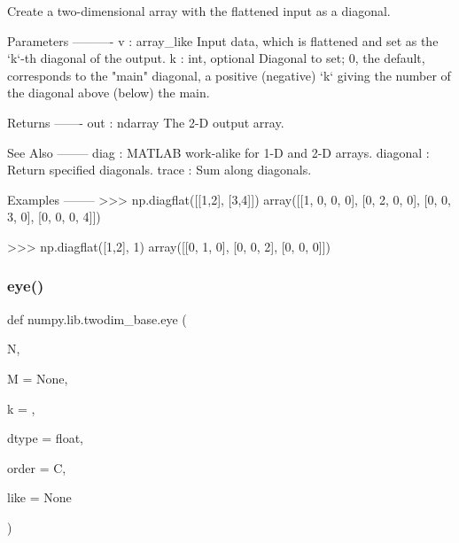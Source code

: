 \begin{DoxyVerb}Create a two-dimensional array with the flattened input as a diagonal.

Parameters
----------
v : array_like
    Input data, which is flattened and set as the `k`-th
    diagonal of the output.
k : int, optional
    Diagonal to set; 0, the default, corresponds to the "main" diagonal,
    a positive (negative) `k` giving the number of the diagonal above
    (below) the main.

Returns
-------
out : ndarray
    The 2-D output array.

See Also
--------
diag : MATLAB work-alike for 1-D and 2-D arrays.
diagonal : Return specified diagonals.
trace : Sum along diagonals.

Examples
--------
>>> np.diagflat([[1,2], [3,4]])
array([[1, 0, 0, 0],
       [0, 2, 0, 0],
       [0, 0, 3, 0],
       [0, 0, 0, 4]])

>>> np.diagflat([1,2], 1)
array([[0, 1, 0],
       [0, 0, 2],
       [0, 0, 0]])\end{DoxyVerb}
 \mbox{\label{namespacenumpy_1_1lib_1_1twodim__base_a7a0b29351e4930dbb6ad06d35256e59b}} 
\subsubsection{\texorpdfstring{eye()}{eye()}}
{\footnotesize\ttfamily def numpy.\+lib.\+twodim\+\_\+base.\+eye (\begin{DoxyParamCaption}\item[{}]{N,  }\item[{}]{M = {\ttfamily None},  }\item[{}]{k = {},  }\item[{}]{dtype = {\ttfamily float},  }\item[{}]{order = {\ttfamily \textquotesingle{}C\textquotesingle{}},  }\item[{}]{like = {\ttfamily None} }\end{DoxyParamCaption})}


